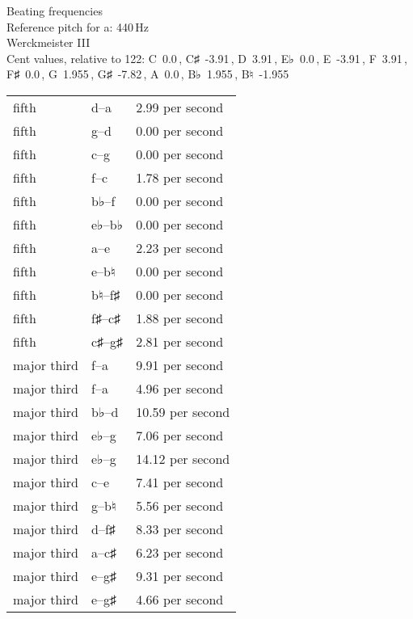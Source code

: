 \documentclass{standalone}
\def\str{\textquotesingle}
\def\cn{\textcent}
\begin{document}
\begin{minipage}{8cm}
\begin{center}
  {\Large Beating frequencies}\\[2ex]
  Reference pitch for a\str: 440\,Hz\\[1ex]
  Werckmeister III\\[1ex]
  Cent values, relative to 122: C~0.0\,\cn, C♯~-3.91\,\cn, D~3.91\,\cn, E♭~0.0\,\cn, E~-3.91\,\cn, F~3.91\,\cn, F♯~0.0\,\cn, G~1.955\,\cn, G♯~-7.82\,\cn, A~0.0\,\cn, B♭~1.955\,\cn, B♮~-1.955\,\cn
\end{center}
\begin{longtable}{p{2cm}p{1cm}p{3cm}}
  \toprule
  fifth & d\str--a\str & 2.99 per second \\fifth & g--d\str & 0.00 per second \\fifth & c\str--g\str & 0.00 per second \\fifth & f--c\str & 1.78 per second \\fifth & b♭--f\str & 0.00 per second \\fifth & e♭--b♭ & 0.00 per second \\fifth & a--e\str & 2.23 per second \\fifth & e--b♮ & 0.00 per second \\fifth & b♮--f♯\str & 0.00 per second \\fifth & f♯--c♯\str & 1.88 per second \\fifth & c♯\str--g♯\str & 2.81 per second \\major third & f\str--a\str & 9.91 per second \\major third & f--a & 4.96 per second \\major third & b♭--d\str & 10.59 per second \\major third & e♭--g & 7.06 per second \\major third & e♭\str--g\str & 14.12 per second \\major third & c\str--e\str & 7.41 per second \\major third & g--b♮ & 5.56 per second \\major third & d\str--f♯\str & 8.33 per second \\major third & a--c♯\str & 6.23 per second \\major third & e\str--g♯\str & 9.31 per second \\major third & e--g♯ & 4.66 per second \\
  \bottomrule
\end{longtable}
\end{minipage}
\end{document}
